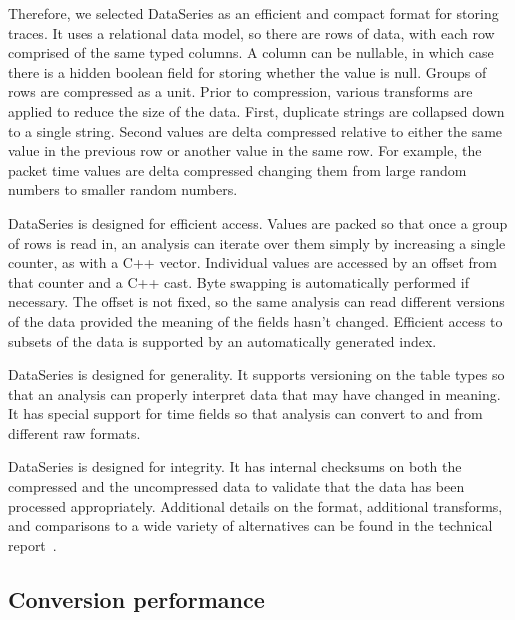 Therefore, we selected DataSeries as an efficient and compact format
for storing traces.  It uses a relational data model, so
there are rows of data, with each row comprised of the same typed
columns.  A column can be nullable, in which case there is a hidden
boolean field for storing whether the value is null.  Groups of rows
are compressed as a unit.  Prior to compression,
various transforms are applied to reduce the size of the data.  First,
duplicate strings are collapsed down to a single
string.  Second values are delta compressed relative to either the
same value in the previous row or another value in the same row.  For
example, the packet time values are delta compressed changing them
from large random numbers to smaller random numbers.

DataSeries is designed for efficient access. Values are packed so that
once a group of rows is read in, an analysis can iterate over them
simply by increasing a single counter, as with a C++ vector.
Individual values are accessed by an offset from that
counter and a C++ cast.  Byte swapping is automatically
performed if necessary.  The offset is not fixed, so the same analysis can read
different versions of the data provided the meaning of the fields
hasn't changed.  Efficient access to subsets of the data is supported
by an automatically generated index.

DataSeries is designed for generality. It supports versioning on the
table types so that an analysis can properly interpret data that may
have changed in meaning.  It has special support for time fields so
that analysis can convert to and from different raw formats.

DataSeries is designed for integrity.  It has internal checksums on
both the compressed and the uncompressed data to validate that the
data has been processed appropriately.  Additional details on the
format, additional transforms, and comparisons to a wide variety of
alternatives can be found in the technical
report~\cite{DSTechnicalReportSnapshot}.

\subsection{Conversion performance}

